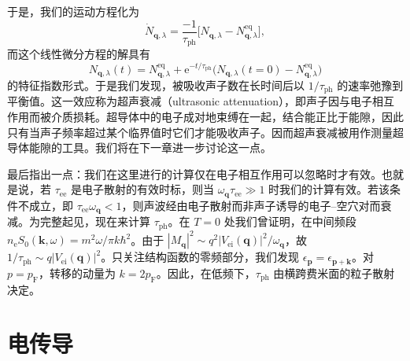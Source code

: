 于是，我们的运动方程化为
\begin{equation*}
\dot{N}_{\mathbf{q},\lambda}=\frac{-1}{\tau_{\mathrm{ph}}}\bigl[N_{\mathbf{q},\lambda}-N^{\mathrm{eq}}_{\mathbf{q},\lambda}\bigr],\tag{11.57}
\end{equation*}
而这个线性微分方程的解具有
\begin{equation*}
N_{\mathbf{q},\lambda}(t)=N^{\mathrm{eq}}_{\mathbf{q},\lambda}+\mathrm{e}^{-t/\tau_{\mathrm{ph}}}\bigl(N_{\mathbf{q},\lambda}(t=0)-N^{\mathrm{eq}}_{\mathbf{q},\lambda}\bigr)\tag{11.58}
\end{equation*}
的特征指数形式。于是我们发现，被吸收声子数在长时间后以 $1/\tau_{\mathrm{ph}}$ 的速率弛豫到平衡值。这一效应称为超声衰减（ultrasonic attenuation），即声子因与电子相互作用而被介质损耗。超导体中的电子成对地束缚在一起，结合能正比于能隙，因此只有当声子频率超过某个临界值时它们才能吸收声子。因而超声衰减被用作测量超导体能隙的工具。我们将在下一章进一步讨论这一点。

最后指出一点：我们在这里进行的计算仅在电子相互作用可以忽略时才有效。也就是说，若 $\tau_{\mathrm{ee}}$ 是电子散射的有效时标，则当 $\omega_{\mathbf{q}}\tau_{\mathrm{ee}}\gg 1$ 时我们的计算有效。若该条件不成立，即 $\tau_{\mathrm{ee}}\omega_{\mathbf{q}}<1$，则声波经由电子散射而非声子诱导的电子–空穴对而衰减。为完整起见，现在来计算 $\tau_{\mathrm{ph}}$。在 $T=0$ 处我们曾证明，在中间频段 $n_{\mathrm{e}}S_0(\mathbf{k},\omega)=m^2\omega/\pi k\hbar^2$。由于 $|M_{\mathbf{q}}|^2\sim q^2|V_{\mathrm{ei}}(\mathbf{q})|^2/\omega_{\mathbf{q}}$，故 $1/\tau_{\mathrm{ph}}\sim q|V_{\mathrm{ei}}(\mathbf{q})|^2$。只关注结构函数的零频部分，我们发现 $\epsilon_{\mathbf{p}}=\epsilon_{\mathbf{p}+\mathbf{k}}$。对 $p=p_{\mathrm{F}}$，转移的动量为 $k=2p_{\mathrm{F}}$。因此，在低频下，$\tau_{\mathrm{ph}}$ 由横跨费米面的粒子散射决定。

\section{电传导}

